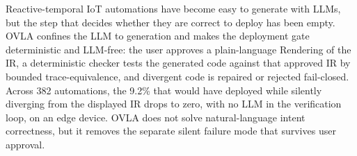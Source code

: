 \documentclass[sigconf,nonacm,anonymous,review]{acmart}
\begin{document}
Reactive-temporal IoT automations have become easy to generate with LLMs, but the step that decides whether they are correct to deploy has been empty. OVLA confines the LLM to generation and makes the deployment gate deterministic and LLM-free: the user approves a plain-language Rendering of the IR, a deterministic checker tests the generated code against that approved IR by bounded trace-equivalence, and divergent code is repaired or rejected fail-closed. Across 382 automations, the 9.2\% that would have deployed while silently diverging from the displayed IR drops to zero, with no LLM in the verification loop, on an edge device. OVLA does not solve natural-language intent correctness, but it removes the separate silent failure mode that survives user approval.

\balance


\end{document}
